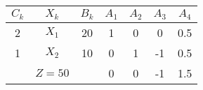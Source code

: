     \begin{tabular}{ccccccc}
    \hline
    \hline
    $C_k$   & $X_k$   & $B_k$   & $A_1$   & $A_2$   & $A_3$   & $A_4$ \bigstrut\\
    \hline
    2       & $X_1$   & 20      & 1       & 0       & 0       & 0.5 \bigstrut[t]\\
    1       & $X_2$   & 10      & 0       & 1       & -1      & 0.5 \bigstrut[b]\\
    \hline
            & $Z=50$  &         & 0       & 0       & -1      & 1.5 \bigstrut\\
    \hline
    \hline
    \end{tabular}%

